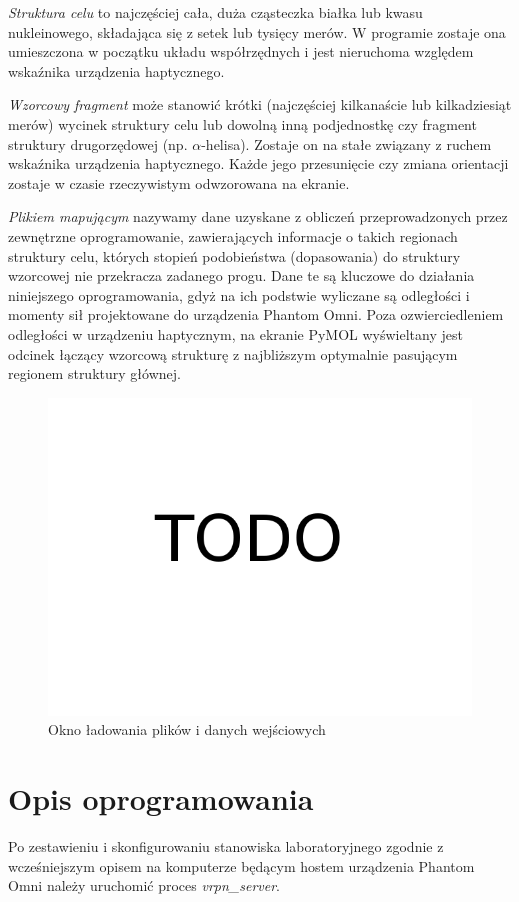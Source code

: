 \documentclass[licencjacka]{pracamgr}
\begin{document}
\textit{Struktura celu} to najczęściej cała, duża cząsteczka białka lub kwasu nukleinowego, składająca się z setek lub tysięcy merów. W programie zostaje ona umieszczona w początku układu współrzędnych i jest nieruchoma względem wskaźnika urządzenia haptycznego.

\textit{Wzorcowy fragment} może stanowić krótki (najczęściej kilkanaście lub kilkadziesiąt merów) wycinek struktury celu lub dowolną inną podjednostkę czy fragment struktury drugorzędowej (np. $\alpha$-helisa). Zostaje on na stałe związany z ruchem wskaźnika urządzenia haptycznego. Każde jego przesunięcie czy zmiana orientacji zostaje w czasie rzeczywistym odwzorowana na ekranie. 

\textit{Plikiem mapującym} nazywamy dane uzyskane z obliczeń przeprowadzonych przez zewnętrzne oprogramowanie, zawierających informacje o takich regionach struktury celu, których stopień podobieństwa (dopasowania) do struktury wzorcowej nie przekracza zadanego progu. Dane te są kluczowe do działania niniejszego oprogramowania, gdyż na ich podstwie wyliczane są odległości i momenty sił projektowane do urządzenia Phantom Omni. Poza ozwierciedleniem odległości w urządzeniu haptycznym, na ekranie PyMOL wyświeltany jest odcinek łączący wzorcową strukturę z najbliższym optymalnie pasującym regionem struktury głównej.

\begin{figure}[H]
\centering
\includegraphics[scale=0.3,center]{todo}
\caption{Okno ładowania plików i danych wejściowych}
\end{figure}

\section{Opis oprogramowania}
Po zestawieniu i skonfigurowaniu stanowiska laboratoryjnego zgodnie z wcześniejszym opisem na komputerze będącym hostem urządzenia Phantom Omni należy uruchomić proces \textit{vrpn\_server}.
\end{document}
